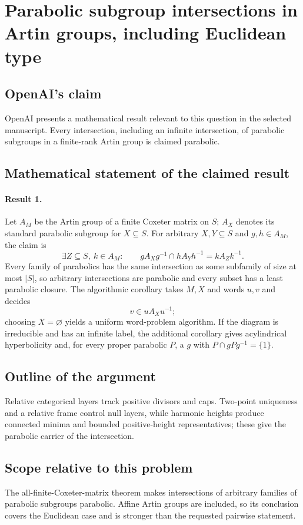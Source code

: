 \documentclass[11pt]{article}
\begin{document}
\section*{Parabolic subgroup intersections in Artin groups, including Euclidean type}

\subsection{OpenAI's claim}
OpenAI presents a mathematical result relevant to this question in the selected manuscript. Every intersection, including an infinite intersection, of parabolic subgroups in a finite-rank Artin group is claimed parabolic.

\subsection{Mathematical statement of the claimed result}
\paragraph{Result 1.} Let \(A_M\) be the Artin group of a finite Coxeter matrix on \(S\); \(A_X\) denotes its standard parabolic subgroup for \(X\subseteq S\). For arbitrary \(X,Y\subseteq S\) and \(g,h\in A_M\), the claim is
\[
 \exists Z\subseteq S,\ k\in A_M:\qquad
 gA_Xg^{-1}\cap hA_Yh^{-1}=kA_Zk^{-1}.
\]
Every family of parabolics has the same intersection as some subfamily of size at most \(|S|\), so arbitrary intersections are parabolic and every subset has a least parabolic closure. The algorithmic corollary takes \(M,X\) and words \(u,v\) and decides
\[
 v\in uA_Xu^{-1};
\]
choosing \(X=\varnothing\) yields a uniform word-problem algorithm. If the diagram is irreducible and has an infinite label, the additional corollary gives acylindrical hyperbolicity and, for every proper parabolic \(P\), a \(g\) with \(P\cap gPg^{-1}=\{1\}\).

\subsection{Outline of the argument}
Relative categorical layers track positive divisors and caps. Two-point uniqueness and a relative frame control null layers, while harmonic heights produce connected minima and bounded positive-height representatives; these give the parabolic carrier of the intersection.

\subsection{Scope relative to this problem}
The all-finite-Coxeter-matrix theorem makes intersections of arbitrary families of parabolic subgroups parabolic. Affine Artin groups are included, so its conclusion covers the Euclidean case and is stronger than the requested pairwise statement.
\end{document}
